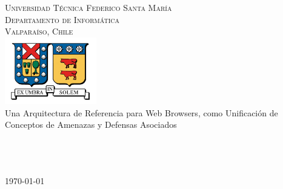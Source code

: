\begin{titlepage}

\begin{center}

\textsc{\Large Universidad Técnica Federico Santa María}\\
\textsc{\large Departamento de Informática}\\
\textsc{\large Valparaíso, Chile}\\[1.5cm]

\includegraphics[width=0.3\textwidth]{figures/utfsm.jpg}\\[1cm]    

{ \huge Una Arquitectura de Referencia para Web Browsers, como Unificación de Conceptos de Amenazas y Defensas Asociados }\\[2cm]

\\[2cm]
\\[3cm]
\\

\vfill

{\large \today}

\end{center}

\end{titlepage}
